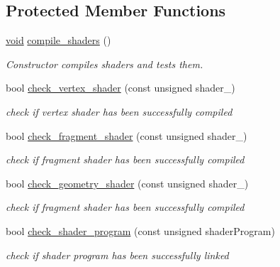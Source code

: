 \subsection*{Protected Member Functions}
\begin{DoxyCompactItemize}
\item 
\mbox{\hyperlink{glad_8h_a950fc91edb4504f62f1c577bf4727c29}{void}} \mbox{\hyperlink{classShader_3_01RENDER__TYPE_1_1CUSTOM_01_4_aede40b234ac1e38be9d0f9f2a60a26ab}{compile\+\_\+shaders}} ()
\begin{DoxyCompactList}\small\item\em Constructor compiles shaders and tests them. \end{DoxyCompactList}\item 
bool \mbox{\hyperlink{classShader_3_01RENDER__TYPE_1_1CUSTOM_01_4_afca4ecec5bed3cf6a9f219ce52e5343e}{check\+\_\+vertex\+\_\+shader}} (const unsigned shader\+\_\+)
\begin{DoxyCompactList}\small\item\em check if vertex shader has been successfully compiled \end{DoxyCompactList}\item 
bool \mbox{\hyperlink{classShader_3_01RENDER__TYPE_1_1CUSTOM_01_4_a8ba4a9ccbbf73e471434981a62b15d41}{check\+\_\+fragment\+\_\+shader}} (const unsigned shader\+\_\+)
\begin{DoxyCompactList}\small\item\em check if fragment shader has been successfully compiled \end{DoxyCompactList}\item 
bool \mbox{\hyperlink{classShader_3_01RENDER__TYPE_1_1CUSTOM_01_4_aca3ba4448a05303b92667e88e18f5cfb}{check\+\_\+geometry\+\_\+shader}} (const unsigned shader\+\_\+)
\begin{DoxyCompactList}\small\item\em check if fragment shader has been successfully compiled \end{DoxyCompactList}\item 
bool \mbox{\hyperlink{classShader_3_01RENDER__TYPE_1_1CUSTOM_01_4_af59ced307a40764c2fa1acef66e074b3}{check\+\_\+shader\+\_\+program}} (const unsigned shader\+Program)
\begin{DoxyCompactList}\small\item\em check if shader program has been successfully linked \end{DoxyCompactList}\end{DoxyCompactItemize}
